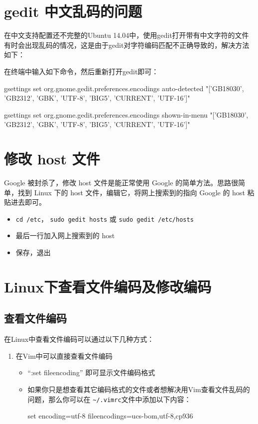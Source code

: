 {\section{gedit 中文乱码的问题}
在中文支持配置还不完整的Ubuntu 14.04中，使用gedit打开带有中文字符的文件有时会出现乱码的情况，这是由于gedit对字符编码匹配不正确导致的，解决方法如下：

在终端中输入如下命令，然后重新打开gedit即可：

    gsettings set org.gnome.gedit.preferences.encodings auto-detected "['GB18030', 'GB2312', 'GBK', 'UTF-8', 'BIG5', 'CURRENT', 'UTF-16']"

    gsettings set org.gnome.gedit.preferences.encodings shown-in-menu "['GB18030', 'GB2312', 'GBK', 'UTF-8', 'BIG5', 'CURRENT', 'UTF-16']"



\section{修改 host 文件}
Google 被封杀了，修改 host 文件是能正常使用 Google 的简单方法。思路很简单，找到 Linux 下的 host 文件，编辑它，将网上搜索到的指向 Google 的 host 粘贴进去即可。
\begin{itemize}
\item \verb*|cd /etc|， \verb*|sudo gedit hosts| 或 \verb*|sudo gedit /etc/hosts|
\item 最后一行加入网上搜索到的 host
\item 保存，退出
\end{itemize}



\section{Linux下查看文件编码及修改编码}
\subsection{查看文件编码}
在Linux中查看文件编码可以通过以下几种方式：
\begin{enumerate}
\item 在Vim中可以直接查看文件编码
\begin{itemize}
\item ``:set fileencoding'' 即可显示文件编码格式
\item 如果你只是想查看其它编码格式的文件或者想解决用Vim查看文件乱码的问题，那么你可以在
\verb|~/.vimrc|文件中添加以下内容：

set encoding=utf-8 fileencodings=ucs-bom,utf-8,cp936


\end{itemize}
\end{enumerate}}
